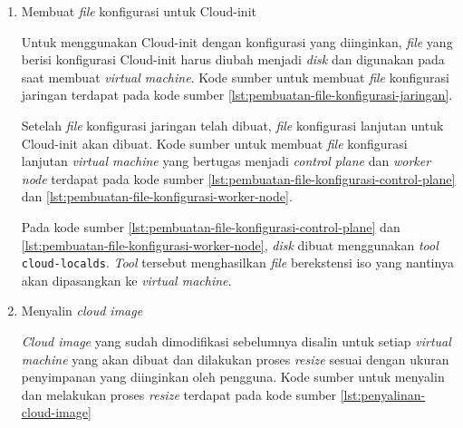 \begin{enumerate}

  \item Membuat \emph{file} konfigurasi untuk Cloud-init

    Untuk menggunakan Cloud-init dengan konfigurasi yang diinginkan, \emph{file}
    yang berisi konfigurasi Cloud-init harus diubah menjadi \emph{disk} dan digunakan
    pada saat membuat \emph{virtual machine}. Kode sumber untuk membuat \emph{file}
    konfigurasi jaringan terdapat pada kode sumber \ref{lst:pembuatan-file-konfigurasi-jaringan}.

    

    Setelah \emph{file} konfigurasi jaringan telah dibuat, \emph{file}
    konfigurasi lanjutan untuk Cloud-init akan dibuat. Kode sumber untuk membuat
    \emph{file} konfigurasi lanjutan \emph{virtual machine} yang bertugas
    menjadi \emph{control plane} dan \emph{worker node} terdapat pada kode sumber
    \ref{lst:pembuatan-file-konfigurasi-control-plane} dan \ref{lst:pembuatan-file-konfigurasi-worker-node}.

    

    

    Pada kode sumber \ref{lst:pembuatan-file-konfigurasi-control-plane}
    dan \ref{lst:pembuatan-file-konfigurasi-worker-node}, \emph{disk}
    dibuat menggunakan \emph{tool} \lstinline{cloud-localds}. \emph{Tool}
    tersebut menghasilkan \emph{file} berekstensi iso yang nantinya akan
    dipasangkan ke \emph{virtual machine}.

  \item Menyalin \emph{cloud image}

    \emph{Cloud image} yang sudah dimodifikasi sebelumnya disalin untuk
    setiap \emph{virtual machine} yang akan dibuat dan dilakukan proses
    \emph{resize} sesuai dengan ukuran penyimpanan yang diinginkan oleh
    pengguna. Kode sumber untuk menyalin dan melakukan proses \emph{resize}
    terdapat pada kode sumber \ref{lst:penyalinan-cloud-image}


\end{enumerate}
